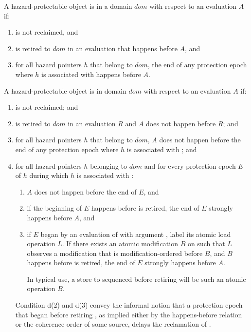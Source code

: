 A hazard-protectable object  is  in a domain $dom$ with respect to
an evaluation $A$ if:
\begin{enumerate}
\item {} is not reclaimed, and
\item {} is retired to $dom$ in an evaluation that happens before $A$, and
\item for all hazard pointers $h$ that belong to $dom$, the end of any protection epoch where $h$ is associated with  happens before $A$.
\end{enumerate}

A hazard-protectable object  is  in domain $dom$ with respect to an
evaluation $A$ if:
\begin{enumerate}
\item {} is not reclaimed; and
\item {} is retired to $dom$ in an evaluation $R$ and $A$ does not happen before $R$; and
\item for all hazard pointers $h$ that belong to $dom$, $A$ does not happen before the end of
any protection epoch where $h$ is associated with ; and
\item for all hazard pointers $h$ belonging to $dom$ and for every protection epoch $E$ of $h$
during which $h$ is associated with :
\begin{enumerate}
  \item $A$ does not happen before the end of $E$, and
  \item if the beginning of $E$ happens before  is retired, the end of $E$ strongly
happens before $A$, and
  \item if $E$ began by an evaluation of  with argument , label its
atomic load operation $L$. If there exists an atomic modification $B$ on  such that $L$ observes a modification that is modification-ordered before $B$, and $B$ happens before  is retired, the end of $E$ strongly happens before $A$. \begin{note} In typical use, a store to  sequenced before retiring  will be such an atomic operation $B$.\end{note}
\end{enumerate}
\begin{note} Condition d(2) and d(3) convey the informal notion that a protection epoch that began before retiring , as implied either by the happens-before relation or the coherence order of some source, delays the reclamation of .\end{note}
\end{enumerate}

